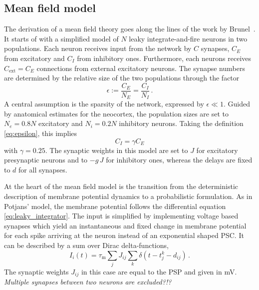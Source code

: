 \subsection{Mean field model}
The derivation of a mean field theory goes along the 
lines of the work by Brunel~\cite{brunel2000}.
It starts of with a simplified model of 
$N$ leaky integrate-and-fire neurons in two populations. 
Each neuron receives input from the network by $C$ synapses, 
$C_E$ from excitatory and $C_I$ from inhibitory ones. 
Furthermore, each neurons receives $C_\text{ext} = C_E$ connections from 
external excitatory neurons.
The synapse numbers 
are determined by the relative size of the two populations through the factor
\begin{equation}
    \epsilon := \frac{C_E}{N_E} = \frac{C_I}{N_I} \,.
    \label{eq:epsilon}
\end{equation}
A central assumption is the sparsity of the network, expressed by $\epsilon \ll 1$.
Guided by anatomical estimates for the neocortex, the population sizes are set to
$N_e = 0.8N$ excitatory and $N_i = 0.2N$ inhibitory neurons. Taking the definition
\eqref{eq:epsilon}, this implies 
\begin{equation}
    C_I = \gamma C_E 	
 \label{eq:C_I}
\end{equation}
with $\gamma = 0.25$. The synaptic weights in this model are set to $J$ for 
excitatory presynaptic neurons and to $-g\, J$ for inhibitory ones, 
whereas the delays are fixed to $d$ for all synapses. 

At the heart of the mean field model
is the transition from the deterministic description of membrane potential 
dynamics to a probabilistic formulation. 
As in Potjans' model, the membrane potential follows
the differential equation \eqref{eq:leaky_integrator}. The input is simplified 
by implementing voltage based synapses which
yield an instantaneous and fixed change in membrane potential
for each spike arriving at the neuron instead of an exponential shaped PSC.
It can be described by a sum over Dirac delta-functions, 
\begin{equation}
    I_i(t) = \tau_\text{m} \sum_j J_{ij} \sum_k \delta(t - t_j^k - d_{ij}) \,.
    \label{eq:input_const_volt}
\end{equation}
The synaptic weights $J_{ij}$ in this case are equal to the PSP and given in mV.  
\emph{Multiple synapses between two neurons are excluded?!?}

